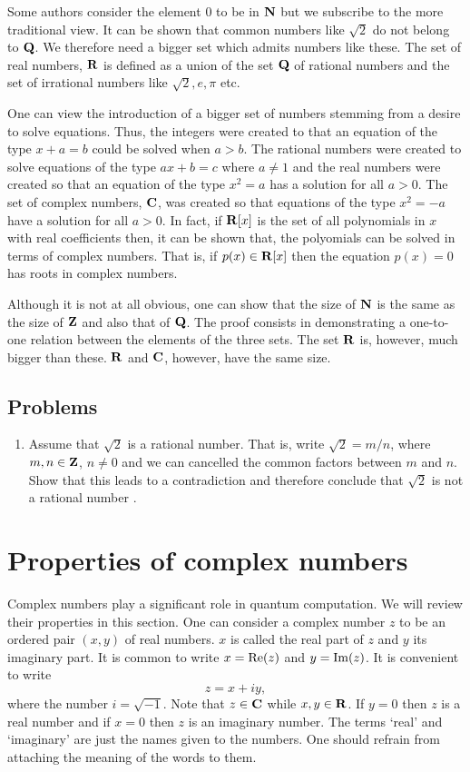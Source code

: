 Some authors consider the element $0$ to be in $\mathbf{N}$ but we subscribe to the more 
traditional view. It can be shown that common numbers like $\sqrt{2}$ do not belong 
to $\mathbf{Q}$. We therefore need a bigger set which admits numbers like these. The set 
of real numbers, $\mathbf{R}$ is defined as a union of the set $\mathbf{Q}$ of rational numbers 
and the  set of irrational numbers like $\sqrt{2}, e, \pi$ etc.

One can view the introduction of a bigger set of numbers stemming from a desire to 
solve equations. Thus, the integers were created to that an equation of the type
$x + a = b$ could be solved when $a > b$. The rational numbers were created to solve
equations of the type $ax + b = c$ where $a \ne 1$ and the real numbers were created
so that an equation of the type $x^2 = a$ has a solution for all $a > 0$. The set of
complex numbers, $\mathbf{C}$, was created so that equations of the type $x^2 = -a$ have a 
solution for all $a > 0$. In fact, if $\mathbf{R}[x]$ is the set of all polynomials in $x$ 
with real coefficients then, it can be shown that, the polyomials can be solved in terms
of complex numbers. That is, if $p(x) \in \mathbf{R}[x]$ then the equation $p(x) = 0$ has
roots in complex numbers.

Although it is not at all obvious, one can show that the size of $\mathbf{N}$ is the same
as the size of $\mathbf{Z}$ and also that of $\mathbf{Q}$. The proof consists in demonstrating
a one-to-one relation between the elements of the three sets. The set $\mathbf{R}$ is,
however, much bigger than these. $\mathbf{R}$ and $\mathbf{C}$, however, have the same size.

\subsection{Problems}
\begin{enumerate}
\item Assume that $\sqrt{2}$ is a rational number. That is, write $\sqrt{2} = m/n$,
where $m, n \in \mathbf{Z}$, $n \ne 0$ and we can cancelled the common factors between $m$
and $n$. Show that this leads to a contradiction and therefore conclude that $\sqrt{2}$
is not a rational number \cite{hardy1992mathematician}.
\end{enumerate}

\section{Properties of complex numbers}\label{c1s3}
Complex numbers play a significant role in quantum computation. We will review their
properties in this section. One can consider a complex number $z$ to be an ordered
pair $(x, y)$ of real numbers. $x$ is called the real part of $z$ and $y$ its imaginary
part. It is common to write $x = \operatorname{Re}(z)$ and $y = \operatorname{Im}(z)$. It is convenient to write
\begin{equation}\label{c1s3e1}
z = x + iy,
\end{equation}
where the number $i = \sqrt{-1}$. Note that $z \in \mathbf{C}$ while $x, y \in \mathbf{R}$. If $y=0$
then $z$ is a real number and if $x = 0$ then $z$ is an imaginary number. The terms
`real' and `imaginary' are just the names given to the numbers. One should refrain from
attaching the meaning of the words to them. 

